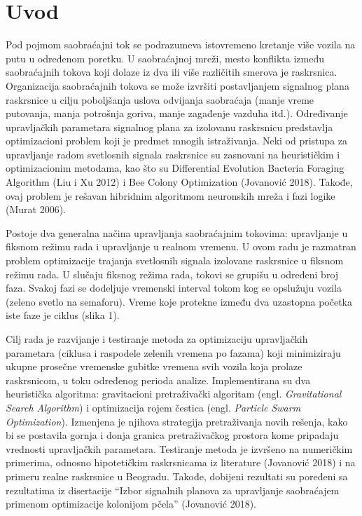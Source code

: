 \section{Uvod}

Pod pojmom saobraćajni tok se podrazumeva istovremeno kretanje više vozila na putu u određenom poretku. U saobraćajnoj mreži, mesto konflikta između saobraćajnih tokova koji dolaze iz dva ili više različitih smerova je raskrsnica. Organizacija saobraćajnih tokova se može izvršiti postavljanjem signalnog plana raskrsnice u cilju poboljšanja uslova odvijanja saobraćaja (manje vreme putovanja, manja potrošnja goriva, manje zagađenje vazduha itd.). Određivanje upravljačkih parametara signalnog plana za izolovanu raskrsnicu predstavlja optimizacioni problem koji je predmet mnogih istraživanja. Neki od pristupa za upravljanje radom svetlosnih signala raskrsnice su zasnovani na heurističkim i optimizacionim metodama, kao što su Differential Evolution Bacteria Foraging Algorithm (Liu i Xu 2012) i Bee Colony Optimization (Jovanović 2018). Takođe, ovaj problem je rešavan hibridnim algoritmom neuronskih mreža i fazi logike (Murat 2006).

\AuthorExHere

Postoje dva generalna načina upravljanja saobraćajnim tokovima: upravljanje u fiksnom režimu rada i upravljanje u realnom vremenu. U ovom radu je razmatran problem optimizacije trajanja svetlosnih signala izolovane raskrsnice u fiksnom režimu rada. U slučaju fiksnog režima rada, tokovi se grupišu u određeni broj faza. Svakoj fazi se dodeljuje vremenski interval tokom kog se opslužuju vozila (zeleno svetlo na semaforu). Vreme koje protekne između dva uzastopna početka iste faze je ciklus (slika 1).



Cilj rada je razvijanje i testiranje metoda za optimizaciju upravljačkih parametara (ciklusa i raspodele zelenih vremena po fazama) koji minimiziraju ukupne prosečne vremenske gubitke vremena svih vozila koja prolaze raskrsnicom, u toku određenog perioda analize. Implementirana su dva heuristička algoritma: gravitacioni pretraživački algoritam (engl. \emph{Gravitational Search Algorithm}) i optimizacija rojem čestica (engl. \emph{Particle Swarm Optimization}). Izmenjena je njihova strategija pretraživanja novih rešenja, kako bi se postavila gornja i donja granica pretraživačkog prostora kome pripadaju vrednosti upravljačkih parametara. Testiranje metoda je izvršeno na numeričkim primerima, odnosno hipotetičkim raskrsnicama iz literature (Jovanović 2018) i na primeru realne raskrsnice u Beogradu. Takođe, dobijeni rezultati su poređeni sa rezultatima iz disertacije “Izbor signalnih planova za upravljanje saobraćajem primenom optimizacije kolonijom pčela” (Jovanović 2018).

